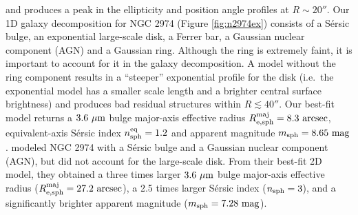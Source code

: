 \documentclass[preprint2]{emulateapj}
\begin{document}
and produces a peak in the ellipticity and position angle profiles at $R \sim 20''$.
Our 1D galaxy decomposition for NGC 2974 (Figure \ref{fig:n2974ex}) consists of a S\'ersic bulge, an exponential large-scale disk,
a Ferrer bar, a Gaussian nuclear component (AGN) and a Gaussian ring.
Although the ring is extremely faint, it is important to account for it in the galaxy decomposition. 
A model without the ring component results in a ``steeper'' exponential profile for the disk 
(i.e.~the exponential model has a smaller scale length and a brighter central surface brightness) 
and produces bad residual structures within $R \lesssim 40''$.
Our best-fit model returns a $3.6~\rm \mu m$ bulge major-axis effective radius $R_{\rm e,sph}^{\rm maj} = 8.3\rm~arcsec$, 
equivalent-axis S\'ersic index $n_{\rm sph}^{\rm eq} = 1.2$ and apparent magnitude $m_{\rm sph} = 8.65~\rm mag$.
\cite{sani2011} modeled NGC 2974 with a S\'ersic bulge and a Gaussian nuclear component (AGN), 
but did not account for the large-scale disk.
From their best-fit 2D model, they obtained a three times larger 
$3.6~\rm \mu m$ bulge major-axis effective radius ($R_{\rm e,sph}^{\rm maj} = 27.2\rm~arcsec$), 
a 2.5 times larger S\'ersic index ($n_{\rm sph} = 3$),
and a significantly brighter apparent magnitude ($m_{\rm sph} = 7.28~\rm mag$).
\end{document}
